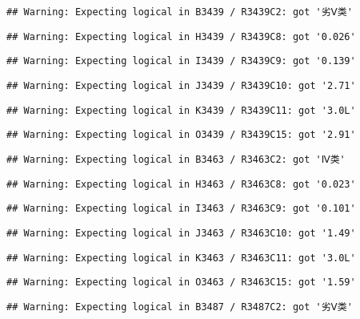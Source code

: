 \documentclass[
]{article}
\begin{document}
\begin{verbatim}
## Warning: Expecting logical in B3439 / R3439C2: got '劣Ⅴ类'
\end{verbatim}

\begin{verbatim}
## Warning: Expecting logical in H3439 / R3439C8: got '0.026'
\end{verbatim}

\begin{verbatim}
## Warning: Expecting logical in I3439 / R3439C9: got '0.139'
\end{verbatim}

\begin{verbatim}
## Warning: Expecting logical in J3439 / R3439C10: got '2.71'
\end{verbatim}

\begin{verbatim}
## Warning: Expecting logical in K3439 / R3439C11: got '3.0L'
\end{verbatim}

\begin{verbatim}
## Warning: Expecting logical in O3439 / R3439C15: got '2.91'
\end{verbatim}

\begin{verbatim}
## Warning: Expecting logical in B3463 / R3463C2: got 'Ⅳ类'
\end{verbatim}

\begin{verbatim}
## Warning: Expecting logical in H3463 / R3463C8: got '0.023'
\end{verbatim}

\begin{verbatim}
## Warning: Expecting logical in I3463 / R3463C9: got '0.101'
\end{verbatim}

\begin{verbatim}
## Warning: Expecting logical in J3463 / R3463C10: got '1.49'
\end{verbatim}

\begin{verbatim}
## Warning: Expecting logical in K3463 / R3463C11: got '3.0L'
\end{verbatim}

\begin{verbatim}
## Warning: Expecting logical in O3463 / R3463C15: got '1.59'
\end{verbatim}

\begin{verbatim}
## Warning: Expecting logical in B3487 / R3487C2: got '劣Ⅴ类'
\end{verbatim}
\end{document}
